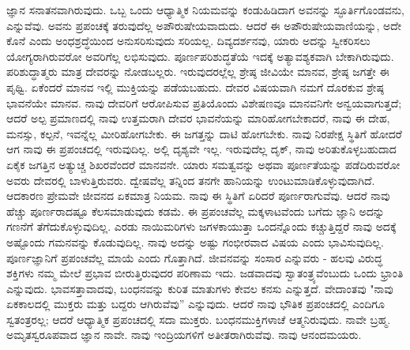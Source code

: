 ಜ್ಞಾನ ಸನಾತನವಾಗಿರುವುದು. ಒಬ್ಬ ಒಂದು ಆಧ್ಯಾತ್ಮಿಕ ನಿಯಮವನ್ನು ಕಂಡುಹಿಡಿದಾಗ ಅವನನ್ನು ಸ್ಫೂರ್ತಿಗೊಂಡವನು, ಎನ್ನುವೆವು. ಅವನು ಪ್ರಪಂಚಕ್ಕೆ ತರುವುದೆಲ್ಲ ಅಪೌರುಷೇಯವಾದುದು. ಆದರೆ ಈ ಅಪೌರುಷೇಯವಾಣಿಯನ್ನು, ಅದೇ ಕೊನೆ ಎಂದು ಅಂಧಶ್ರದ್ಧೆಯಿಂದ ಅನುಸರಿಸುವುದು ಸರಿಯಲ್ಲ. ದಿವ್ಯದರ್ಶನವು, ಯಾರು ಅದನ್ನು ಸ್ವೀಕರಿಸಲು ಯೋಗ್ಯರಾಗಿರುವರೋ ಅವರಿಗೆಲ್ಲ ಲಭಿಸುವುದು. ಪೂರ್ಣಪರಿಶುದ್ಧತೆಯೆ ಇದಕ್ಕೆ ಅತ್ಯಾವಶ್ಯಕವಾಗಿ ಬೇಕಾಗಿರುವುದು. ಪರಿಶುದ್ಧಾತ್ಮರು ಮಾತ್ರ ದೇವರನ್ನು ನೋಡಬಲ್ಲರು. ಇರುವುದರಲ್ಲೆಲ್ಲ ಶ್ರೇಷ್ಠ ಜೀವಿಯೇ ಮಾನವ, ಶ್ರೇಷ್ಠ ಜಗತ್ತೇ ಈ ಪೃಥ್ವಿ. ಏಕೆಂದರೆ ಮಾನವ ಇಲ್ಲಿ ಮುಕ್ತಿಯನ್ನು ಪಡೆಯಬಹುದು. ದೇವರ ವಿಷಯವಾಗಿ ನಮಗೆ ದೊರಕುವ ಶ್ರೇಷ್ಠ ಭಾವನೆಯೇ ಮಾನವ. ನಾವು ದೇವರಿಗೆ ಆರೋಪಿಸುವ ಪ್ರತಿಯೊಂದು ವಿಶೇಷಣವೂ ಮಾನವನಿಗೇ ಅನ್ವಯವಾಗುತ್ತದೆ; ಆದರೆ ಅಲ್ಪ ಪ್ರಮಾಣದಲ್ಲಿ ನಾವು ಉತ್ತಮರಾಗಿ ದೇವರ ಭಾವನೆಯನ್ನು ಮಾರಿಹೋಗಬೇಕಾದರೆ, ನಾವು ಈ ದೇಹ, ಮನಸ್ಸು, ಕಲ್ಪನೆ, ಇವನ್ನೆಲ್ಲ ಮೀರಿಹೋಗಬೇಕು. ಈ ಜಗತ್ತನ್ನು ದಾಟಿ ಹೋಗಬೇಕು. ನಾವು ನಿರಪೇಕ್ಷ ಸ್ಥಿತಿಗೆ ಹೋದರೆ ಆಗ ನಾವು ಈ ಪ್ರಪಂಚದಲ್ಲಿ ಇರುವುದಿಲ್ಲ. ಅಲ್ಲಿ ದೃಶ್ಯವೇ ಇಲ್ಲ. ಇರುವುದೆಲ್ಲ ದೃಕ್, ನಾವು ಅರಿತುಕೊಳ್ಳಬಹುದಾದ ಏಕೈಕ ಜಗತ್ತಿನ ಅತ್ಯುಚ್ಚ ಶಿಖರವೆಂದರೆ ಮಾನವನೇ. ಯಾರು ಸಮತ್ವವನ್ನು ಅಥವಾ ಪೂರ್ಣತೆಯನ್ನು ಪಡೆದಿರುವರೋ ಅವರು ದೇವರಲ್ಲಿ ಬಾಳುತ್ತಿರುವರು. ದ್ವೇಷವೆಲ್ಲ ತನ್ನಿಂದ ತನಗೇ ಹಾನಿಯನ್ನು ಉಂಟುಮಾಡಿಕೊಳ್ಳುವುದಾಗಿದೆ. ಆದಕಾರಣ ಪ್ರೇಮವೇ ಜೀವನದ ಏಕಮಾತ್ರ ನಿಯಮ. ನಾವು ಈ ಸ್ಥಿತಿಗೆ ಏರಿದರೆ ಪೂರ್ಣರಾಗುವೆವು. ಆದರೆ ನಾವು ಹೆಚ್ಚು ಪೂರ್ಣರಾದಷ್ಟೂ ಕೆಲಸಮಾಡುವುದು ಕಡಮೆ. ಈ ಪ್ರಪಂಚವೆಲ್ಲ ಮಕ್ಕಳಾಟವೆಂದು ಬಗೆದು ಜ್ಞಾನಿ ಅದನ್ನು ಗಣನೆಗೆ ತೆಗೆದುಕೊಳ್ಳುವುದಿಲ್ಲ. ಎರಡು ನಾಯಿಮರಿಗಳು ಜಗಳಕಾಯುತ್ತಾ ಒಂದನ್ನೊಂದು ಕಚ್ಚುತ್ತಿದ್ದರೆ ನಾವು ಅದಕ್ಕೆ ಅಷ್ಟೊಂದು ಗಮನವನ್ನು ಕೊಡುವುದಿಲ್ಲ. ನಾವು ಅದನ್ನು ಅಷ್ಟು ಗಂಭೀರವಾದ ವಿಷಯ ಎಂದು ಭಾವಿಸುವುದಿಲ್ಲ. ಪೂರ್ಣಜ್ಞಾನಿಗೆ ಪ್ರಪಂಚವೆಲ್ಲ ಮಾಯೆ ಎಂದು ಗೊತ್ತಾಗಿದೆ. ಜೀವನವನ್ನು ಸಂಸಾರ ಎನ್ನುವರು - ಹಲವು ವಿರುದ್ಧ ಶಕ್ತಿಗಳು ನಮ್ಮ ಮೇಲೆ ಪ್ರಭಾವ ಬೀರುತ್ತಿರುವುದರ ಪರಿಣಾಮ ಇದು. ಜಡವಾದವು ಸ್ವಾತಂತ್ರ್ಯವೆಂಬುದು ಒಂದು ಭ್ರಾಂತಿ ಎನ್ನುವುದು. ಭಾವಸತ್ತಾವಾದವು, ಬಂಧನವನ್ನು ಕುರಿತ ಮಾತುಗಳು ಕೇವಲ ಕನಸು ಎನ್ನುತ್ತದೆ. ವೇದಾಂತವು "ನಾವು ಏಕಕಾಲದಲ್ಲಿ ಮುಕ್ತರು ಮತ್ತು ಬದ್ದರು ಆಗಿರುವೆವು'' ಎನ್ನುವುದು. ಆದರೆ ನಾವು ಭೌತಿಕ ಪ್ರಪಂಚದಲ್ಲಿ ಎಂದಿಗೂ ಸ್ವತಂತ್ರರಲ್ಲ; ಆದರೆ ಆಧ್ಯಾತ್ಮಿಕ ಪ್ರಪಂಚದಲ್ಲಿ ಸದಾ ಮುಕ್ತರು. ಬಂಧನಮುಕ್ತಿಗಳಾಚೆ ಆತ್ಮನಿರುವುದು. ನಾವೇ ಬ್ರಹ್ಮ. ಅಮೃತಸ್ವರೂಪವಾದ ಜ್ಞಾನ ನಾವೇ. ನಾವು ಇಂದ್ರಿಯಗಳಿಗೆ ಅತೀತರಾಗಿರುವೆವು. ನಾವು ಆನಂದಮಯರು.

